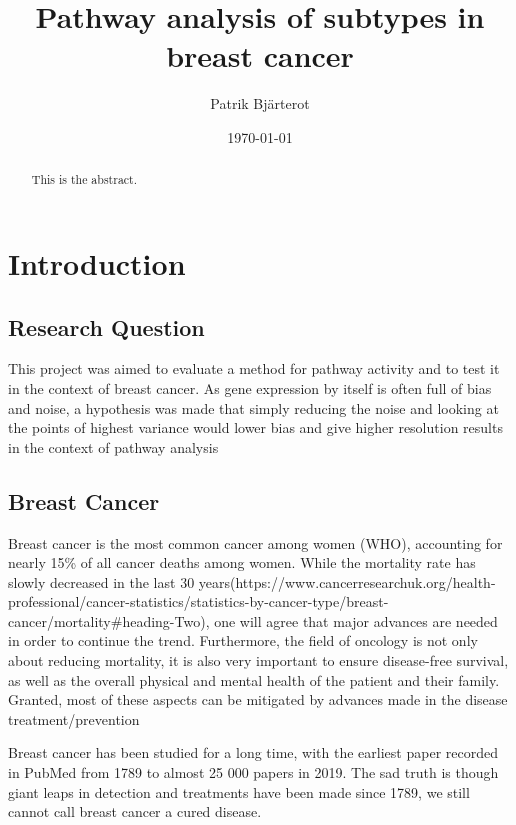 \documentclass{kththesis}
\title{Pathway analysis of subtypes in breast cancer}
\author{Patrik Bjärterot}
\date{\today}
\begin{document}
\frontmatter

\titlepage

\begin{abstract}
  This is the abstract.

\end{abstract}

\tableofcontents


\mainmatter


\chapter{Introduction}

    \section{Research Question}
    This project was aimed to evaluate a method for pathway activity and to test it in the context of breast cancer. As gene expression by itself is often full of bias and noise,
    a hypothesis was made that simply reducing the noise and looking at the points of highest variance would lower bias and give higher resolution results in the context of pathway analysis



    \section{Breast Cancer}
    Breast cancer is the most common cancer among women (WHO), accounting for nearly 15\% of all cancer deaths among women. While the mortality rate has slowly decreased in the last 30 years(https://www.cancerresearchuk.org/health-professional/cancer-statistics/statistics-by-cancer-type/breast-cancer/mortality#heading-Two), one will agree that major advances are needed in order to continue the trend. Furthermore, the field of oncology is not only about reducing mortality, it is also very important to ensure disease-free survival, as well as the overall physical and mental health of the patient and their family. Granted, most of these aspects can be mitigated by advances made in the disease treatment/prevention

    Breast cancer has been studied for a long time, with the earliest paper recorded in PubMed from 1789 to almost 25 000 papers in 2019. The sad truth is though giant leaps in detection and treatments have been made since 1789, we still cannot call breast cancer a cured disease.
\end{document}
